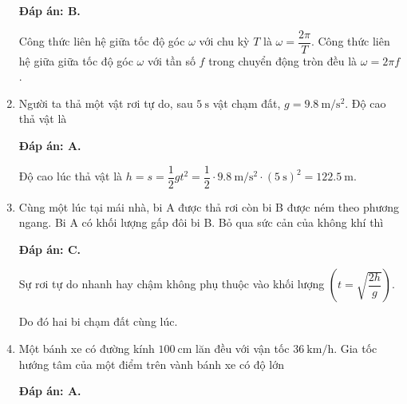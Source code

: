 \begin{enumerate}[label=\bfseries Câu \arabic*:]
{	}
	\loigiai
	{\textbf{Đáp án: B.}
		
		Công thức liên hệ giữa tốc độ góc $\omega$ với chu kỳ $T$ là $\omega=\dfrac{2\pi}{T}$.
		Công thức liên hệ giữa giữa tốc độ góc $\omega$ với tần số $f$ trong chuyển động tròn đều là $\omega=2\pi f$.
	
	}
	
	\item {}
	
	\cauhoi
	{Người ta thả một vật rơi tự do, sau $\SI{5}{\second}$ vật chạm đất, $g=\SI{9.8}{\meter/\second^2}$. Độ cao thả vật là
	}
	\loigiai
	{\textbf{Đáp án: A.}	
		
		Độ cao lúc thả vật là
		$h=s=\dfrac{1}{2}gt^2=\dfrac{1}{2}\cdot\SI{9.8}{\meter/\second^2}\cdot(\SI{5}{\second})^2=\SI{122.5}{\meter}.$
		
		
	}
	\item {}
	
	\cauhoi
	{Cùng một lúc tại mái nhà, bi A được thả rơi còn bi B được ném theo phương ngang. Bi A có khối lượng gấp đôi bi B. Bỏ qua sức cản của không khí thì
		
	}
	\loigiai
	{\textbf{Đáp án: C.}
		
		Sự rơi tự do nhanh hay chậm không phụ thuộc vào khối lượng $\left( t=\sqrt{\dfrac{2h}{g}}\right)$.
		
		Do đó hai bi chạm đất cùng lúc.
		
		
	}
	
	\item {}
	
	\cauhoi
	{Một bánh xe có đường kính $\SI{100}{\centi\meter}$ lăn đều với vận tốc $\SI{36}{\kilo\meter/\hour}$. Gia tốc hướng tâm của một điểm trên vành bánh xe có độ lớn
	}
	\loigiai
	{\textbf{Đáp án: A.}
		
}
\end{enumerate}
